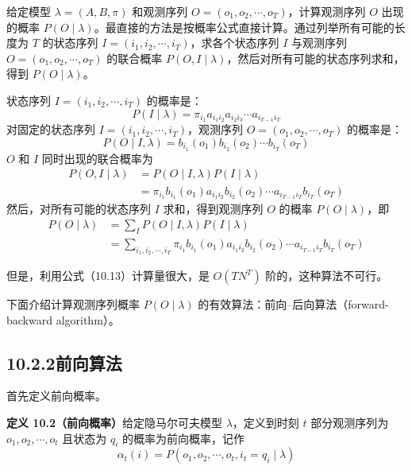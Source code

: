 \documentclass[UTF8,12pt,a4paper,fontset=fandol]{ctexart}
\begin{document}
给定模型 $\lambda=(A,B,\pi)$ 和观测序列 $O=(o_1,o_2,\cdots,o_T)$，计算观测序列 $O$ 出现的概率 $P(O\mid\lambda)$。最直接的方法是按概率公式直接计算。通过列举所有可能的长度为 $T$ 的状态序列 $I=(i_1,i_2,\cdots,i_T)$，求各个状态序列 $I$ 与观测序列 $O=(o_1,o_2,\cdots,o_T)$ 的联合概率 $P(O,I\mid\lambda)$，然后对所有可能的状态序列求和，得到 $P(O\mid\lambda)$。

状态序列 $I=(i_1,i_2,\cdots,i_T)$ 的概率是：
\begin{equation}
  P(I\mid\lambda)=\pi_{i_1}a_{i_1i_2}a_{i_2i_3}\cdots a_{i_{T-1}i_T}
  \tag{10.10}
\end{equation}
对固定的状态序列 $I=(i_1,i_2,\cdots,i_T)$，观测序列 $O=(o_1,o_2,\cdots,o_T)$ 的概率是：
\begin{equation}
  P(O\mid I,\lambda)=b_{i_1}(o_1)b_{i_2}(o_2)\cdots b_{i_T}(o_T)
  \tag{10.11}
\end{equation}
$O$ 和 $I$ 同时出现的联合概率为
\begin{equation}
\begin{aligned}
  P(O,I\mid\lambda)
  &=P(O\mid I,\lambda)P(I\mid\lambda)\\
  &=\pi_{i_1}b_{i_1}(o_1)a_{i_1i_2}b_{i_2}(o_2)\cdots a_{i_{T-1}i_T}b_{i_T}(o_T)
\end{aligned}
  \tag{10.12}
\end{equation}
然后，对所有可能的状态序列 $I$ 求和，得到观测序列 $O$ 的概率 $P(O\mid\lambda)$，即
\begin{equation}
\begin{aligned}
  P(O\mid\lambda)
  &=\sum_I P(O\mid I,\lambda)P(I\mid\lambda)\\
  &=\sum_{i_1,i_2,\cdots,i_T}\pi_{i_1}b_{i_1}(o_1)a_{i_1i_2}b_{i_2}(o_2)\cdots a_{i_{T-1}i_T}b_{i_T}(o_T)
\end{aligned}
  \tag{10.13}
\end{equation}

但是，利用公式（10.13）计算量很大，是 $O(TN^T)$ 阶的，这种算法不可行。

下面介绍计算观测序列概率 $P(O\mid\lambda)$ 的有效算法：前向--后向算法（forward-backward algorithm）。

\subsection*{10.2.2\quad 前向算法}

首先定义前向概率。

\noindent\textbf{定义 10.2（前向概率）}\quad 给定隐马尔可夫模型 $\lambda$，定义到时刻 $t$ 部分观测序列为 $o_1,o_2,\cdots,o_t$ 且状态为 $q_i$ 的概率为前向概率，记作
\begin{equation}
  \alpha_t(i)=P(o_1,o_2,\cdots,o_t,i_t=q_i\mid\lambda)
  \tag{10.14}
\end{equation}
\end{document}

